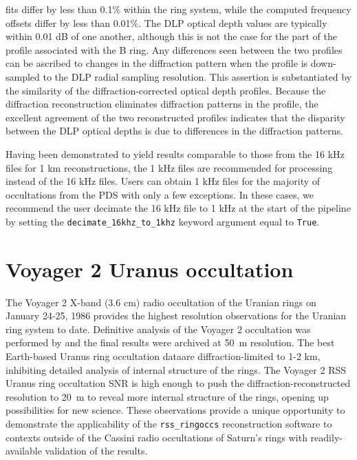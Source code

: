 \documentclass[titlepage, 12pt]{article}
\begin{document}
            fits differ by less than 0.1\% within the ring system,
            while the computed frequency offsets differ by less
            than 0.01\%. The DLP optical depth values are typically
            within 0.01 dB of one another, although this is not
            the case for the part of the profile associated with the
            B ring. Any differences seen between the two profiles
            can be ascribed to changes in the diffraction pattern
            when the profile is down-sampled to the DLP radial
            sampling resolution. This assertion is substantiated
            by the similarity of the diffraction-corrected optical
            depth profiles. Because the diffraction reconstruction
            eliminates diffraction patterns in the profile, the
            excellent agreement of the two reconstructed profiles
            indicates that the disparity between the DLP optical
            depths is due to differences in the diffraction patterns.
            \par\hfill\par
            Having been demonstrated to yield results comparable
            to those from the 16 kHz files for 1 km reconstructions, the 1 kHz files are
            recommended for processing instead of the 16 kHz files.
            Users can obtain 1 kHz files for the majority of
            occultations from the PDS with only a few exceptions.
            In these cases, we recommend the user decimate the 16
            kHz file to 1 kHz at the start of the pipeline by
            setting the \texttt{decimate\_16khz\_to\_1khz}
            keyword argument equal to \texttt{True}.
            
            \section{Voyager 2 Uranus occultation}
            The Voyager 2 X-band (3.6 cm) radio occultation of the Uranian rings on
            January 24-25, 1986 provides the highest resolution observations for the
            Uranian ring system to date. Definitive analysis of the Voyager 2 occultation
            was performed by \citet{Gresh1989} and the final results were archived
            at 50~m resolution. The best Earth-based Uranus ring occultation
            dataare diffraction-limited to 1-2
            km, inhibiting detailed analysis of internal structure of the rings. The Voyager 2 RSS Uranus ring occultation
            SNR is high enough to push the diffraction-reconstructed resolution to 20~m to reveal more internal
            structure of the rings, opening up possibilities for new
            science. These observations provide a unique opportunity to demonstrate the applicability of the \texttt{rss\_ringoccs} reconstruction software to contexts outside of the Cassini radio occultations of Saturn's rings with readily-available validation of the results.
\end{document}
